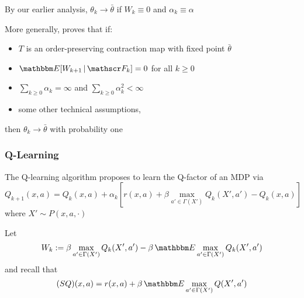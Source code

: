 \documentclass[xcolor=dvipsnames]{beamer}  %
\renewcommand{\geq}{\geqslant}
\newcommand{\1}{\mathbbm 1}
\newcommand{\given}{\, | \,}
\newcommand{\EE}{\mathbbm E}
\newcommand{\fF}{\mathscr F}
\begin{document}
\begin{frame}
    
    By our earlier analysis, $\theta_k \to \bar \theta$ if $W_k \equiv 0$ and
    $\alpha_k \equiv \alpha$

    More generally, \cite{tsitsiklis1994asynchronous} proves that if:
    \begin{itemize}
        \item $T$ is an order-preserving contraction map with fixed
            point $\bar \theta$
        \item $\EE [W_{k+1} \given \fF_k] = 0$ for all $k \geq 0$
        \item $\sum_{k \geq 0} \alpha_k = \infty$ and $\sum_{k \geq 0} \alpha_k^2 < \infty$
        \item some other technical assumptions,
    \end{itemize}
    then $\theta_k \to \bar \theta$ with probability one

\end{frame}


\begin{frame}
    \frametitle{Q-Learning}

    The Q-learning algorithm proposes to learn the Q-factor of an MDP
    via
    \begin{equation*}
        Q_{k+1}(x,a) 
        = Q_k(x,a) + \alpha_k 
        \left[
            r(x,a) + \beta \max_{a' \in \Gamma(X')} Q_k(X', a')
            - Q_k(x,a)
        \right]
    \end{equation*}
    where $X' \sim P(x, a, \cdot)$

    Let
    \begin{equation*}
        W_k 
        := \beta \max_{a' \in \Gamma(X')} Q_k(X', a') 
        - \beta \, \EE \max_{a' \in \Gamma(X')} Q_k(X', a')
    \end{equation*}
    and recall that
    \begin{equation*}
        (S Q)(x,a)
        =  r(x, a) + \beta \,\EE \max_{a' \in \Gamma(X')} Q(X',a')
    \end{equation*}

\end{frame}
\end{document}
